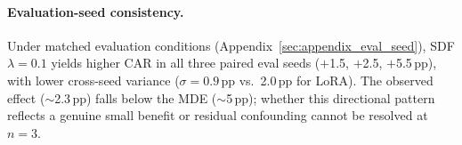 \paragraph{Evaluation-seed consistency.}
Under matched evaluation conditions (Appendix~\ref{sec:appendix_eval_seed}), SDF $\lambda = 0.1$ yields higher CAR in all three paired eval seeds ($+$1.5, $+$2.5, $+$5.5\,pp), with lower cross-seed variance ($\sigma = 0.9$\,pp vs.\ 2.0\,pp for LoRA). The observed effect (${\sim}$2.3\,pp) falls below the MDE (${\sim}$5\,pp); whether this directional pattern reflects a genuine small benefit or residual confounding cannot be resolved at $n = 3$.

